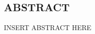 \pagestyle{plain}
\begin{center}


\section*{ABSTRACT}


\end{center}
INSERT ABSTRACT HERE


\cleardoublepage
